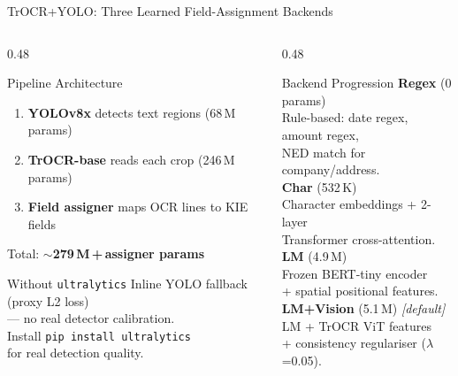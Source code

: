 \documentclass[aspectratio=169,11pt]{beamer}
\begin{document}
\begin{frame}{TrOCR+YOLO: Three Learned Field-Assignment Backends}
  \begin{columns}[T]
    \begin{column}{0.48\textwidth}
      \begin{block}{Pipeline Architecture}
        \begin{enumerate}
          \item \textbf{YOLOv8x} detects text regions (68\,M params)
          \item \textbf{TrOCR-base} reads each crop (246\,M params)
          \item \textbf{Field assigner} maps OCR lines to KIE fields
        \end{enumerate}
        \vspace{4pt}
        {\small Total: \textbf{$\sim$279\,M\,+\,assigner params}}
      \end{block}
      \vspace{0.2cm}
      \begin{alertblock}{Without \texttt{ultralytics}}
        Inline YOLO fallback (proxy L2 loss)\\
        — no real detector calibration.\\
        Install \texttt{pip install ultralytics}\\
        for real detection quality.
      \end{alertblock}
    \end{column}
    \begin{column}{0.48\textwidth}
      \begin{exampleblock}{Backend Progression}
        \textbf{Regex} (0 params)\\
        {\small Rule-based: date regex, amount regex,\\
        NED match for company/address.}\\[6pt]
        \textbf{Char} (532\,K)\\
        {\small Character embeddings + 2-layer\\
        Transformer cross-attention.}\\[6pt]
        \textbf{LM} (4.9\,M)\\
        {\small Frozen BERT-tiny encoder\\
        + spatial positional features.}\\[6pt]
        \textbf{LM+Vision} (5.1\,M) \textit{[default]}\\
        {\small LM + TrOCR ViT features\\
        + consistency regulariser ($\lambda$=0.05).}
      \end{exampleblock}
    \end{column}
  \end{columns}
\end{frame}
\end{document}
